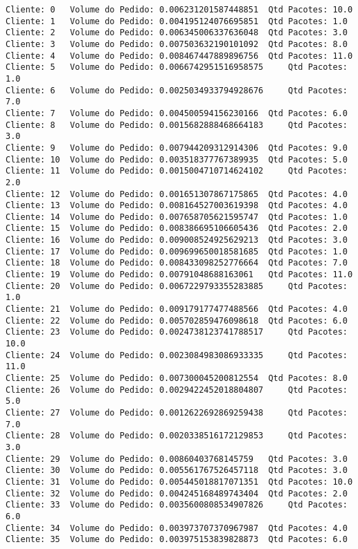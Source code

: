 \documentclass[11pt]{article}
\begin{document}
    \begin{Verbatim}[commandchars=\\\{\}]
Cliente: 0	 Volume do Pedido: 0.006231201587448851	 Qtd Pacotes: 10.0
Cliente: 1	 Volume do Pedido: 0.004195124076695851	 Qtd Pacotes: 1.0
Cliente: 2	 Volume do Pedido: 0.006345006337636048	 Qtd Pacotes: 3.0
Cliente: 3	 Volume do Pedido: 0.007503632190101092	 Qtd Pacotes: 8.0
Cliente: 4	 Volume do Pedido: 0.008467447889896756	 Qtd Pacotes: 11.0
Cliente: 5	 Volume do Pedido: 0.0066742951516958575	 Qtd Pacotes: 1.0
Cliente: 6	 Volume do Pedido: 0.0025034933794928676	 Qtd Pacotes: 7.0
Cliente: 7	 Volume do Pedido: 0.004500594156230166	 Qtd Pacotes: 6.0
Cliente: 8	 Volume do Pedido: 0.0015682888468664183	 Qtd Pacotes: 3.0
Cliente: 9	 Volume do Pedido: 0.007944209312914306	 Qtd Pacotes: 9.0
Cliente: 10	 Volume do Pedido: 0.003518377767389935	 Qtd Pacotes: 5.0
Cliente: 11	 Volume do Pedido: 0.0015004710714624102	 Qtd Pacotes: 2.0
Cliente: 12	 Volume do Pedido: 0.001651307867175865	 Qtd Pacotes: 4.0
Cliente: 13	 Volume do Pedido: 0.008164527003619398	 Qtd Pacotes: 4.0
Cliente: 14	 Volume do Pedido: 0.007658705621595747	 Qtd Pacotes: 1.0
Cliente: 15	 Volume do Pedido: 0.008386695106605436	 Qtd Pacotes: 2.0
Cliente: 16	 Volume do Pedido: 0.009008524925629213	 Qtd Pacotes: 3.0
Cliente: 17	 Volume do Pedido: 0.009699650018581685	 Qtd Pacotes: 1.0
Cliente: 18	 Volume do Pedido: 0.008433098252776664	 Qtd Pacotes: 7.0
Cliente: 19	 Volume do Pedido: 0.00791048688163061	 Qtd Pacotes: 11.0
Cliente: 20	 Volume do Pedido: 0.0067229793355283885	 Qtd Pacotes: 1.0
Cliente: 21	 Volume do Pedido: 0.009179177477488566	 Qtd Pacotes: 4.0
Cliente: 22	 Volume do Pedido: 0.005702859476098618	 Qtd Pacotes: 6.0
Cliente: 23	 Volume do Pedido: 0.0024738123741788517	 Qtd Pacotes: 10.0
Cliente: 24	 Volume do Pedido: 0.0023084983086933335	 Qtd Pacotes: 11.0
Cliente: 25	 Volume do Pedido: 0.007300045200812554	 Qtd Pacotes: 8.0
Cliente: 26	 Volume do Pedido: 0.0029422452018804807	 Qtd Pacotes: 5.0
Cliente: 27	 Volume do Pedido: 0.0012622692869259438	 Qtd Pacotes: 7.0
Cliente: 28	 Volume do Pedido: 0.0020338516172129853	 Qtd Pacotes: 3.0
Cliente: 29	 Volume do Pedido: 0.00860403768145759	 Qtd Pacotes: 3.0
Cliente: 30	 Volume do Pedido: 0.005561767526457118	 Qtd Pacotes: 3.0
Cliente: 31	 Volume do Pedido: 0.005445018817071351	 Qtd Pacotes: 10.0
Cliente: 32	 Volume do Pedido: 0.004245168489743404	 Qtd Pacotes: 2.0
Cliente: 33	 Volume do Pedido: 0.0035600808534907826	 Qtd Pacotes: 6.0
Cliente: 34	 Volume do Pedido: 0.003973707370967987	 Qtd Pacotes: 4.0
Cliente: 35	 Volume do Pedido: 0.003975153839828873	 Qtd Pacotes: 6.0

\end{Verbatim}
\end{document}
